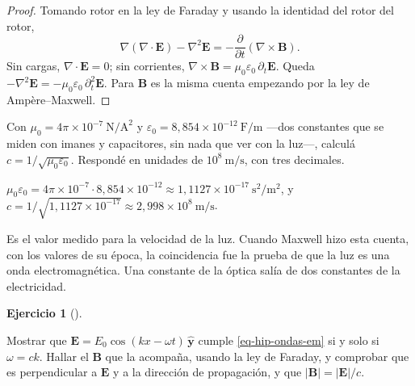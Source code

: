 \documentclass[
  spanish,
  a4paper,
]{scrbook}
\theoremstyle{definition}
\theoremstyle{plain}
\theoremstyle{definition}
\theoremstyle{plain}
\theoremstyle{definition}
\newtheorem{exercise}{Ejercicio}[chapter]
\theoremstyle{remark}
\begin{document}
\begin{proof}
Tomando rotor en la ley de Faraday y usando la identidad del rotor del
rotor, \[
\nabla(\nabla\cdot\mathbf E) - \nabla^2\mathbf E = -\frac{\partial}{\partial t}(\nabla\times\mathbf B).
\] Sin cargas, \(\nabla\cdot\mathbf E = 0\); sin corrientes,
\(\nabla\times\mathbf B = \mu_0\varepsilon_0\,\partial_t\mathbf E\).
Queda
\(-\nabla^2\mathbf E = -\mu_0\varepsilon_0\,\partial_t^2\mathbf E\).
Para \(\mathbf B\) es la misma cuenta empezando por la ley de
Ampère--Maxwell.
\end{proof}

Con \(\mu_0 = 4\pi\times10^{-7}\ \text{N/A}^2\) y
\(\varepsilon_0 = 8{,}854\times10^{-12}\ \text{F/m}\) ---dos constantes
que se miden con imanes y capacitores, sin nada que ver con la luz---,
calculá \(c = 1/\sqrt{\mu_0\varepsilon_0}\). Respondé en unidades de
\(10^8\ \text{m/s}\), con tres decimales.

\(\mu_0\varepsilon_0 = 4\pi\times10^{-7}\cdot8{,}854\times10^{-12} \approx 1{,}1127\times10^{-17}\ \text{s}^2/\text{m}^2\),
y
\(c = 1/\sqrt{1{,}1127\times10^{-17}} \approx 2{,}998\times10^8\ \text{m/s}\).

Es el valor medido para la velocidad de la luz. Cuando Maxwell hizo esta
cuenta, con los valores de su época, la coincidencia fue la prueba de
que la luz es una onda electromagnética. Una constante de la óptica
salía de dos constantes de la electricidad.

\begin{exercise}[]\protect\hypertarget{exr-hip-onda-plana}{}\label{exr-hip-onda-plana}

Mostrar que \(\mathbf E = E_0\cos(kx - \omega t)\,\hat{\mathbf y}\)
cumple \ref{eq-hip-ondas-em} si y solo si \(\omega = ck\). Hallar el
\(\mathbf B\) que la acompaña, usando la ley de Faraday, y comprobar que
es perpendicular a \(\mathbf E\) y a la dirección de propagación, y que
\(|\mathbf B| = |\mathbf E|/c\).

\end{exercise}
\end{document}
